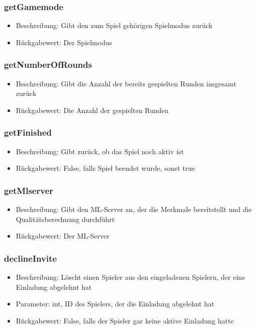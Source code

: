 \documentclass[a4paper]{scrreprt}
\begin{document}
   \subsubsection{getGamemode}
      \begin{itemize}
              \item Beschreibung: Gibt den zum Spiel gehörigen Spielmodus zurück
              \item Rückgabewert: Der Spielmodus
      \end{itemize}
   \subsubsection{getNumberOfRounds}
      \begin{itemize}
              \item Beschreibung: Gibt die Anzahl der bereits gespielten Runden insgesamt zurück
              \item Rückgabewert: Die Anzahl der gespielten Runden
      \end{itemize}     
   \subsubsection{getFinished}
      \begin{itemize}
              \item Beschreibung: Gibt zurück, ob das Spiel noch aktiv ist
              \item Rückgabewert: False, falls Spiel beendet wurde, sonst true
      \end{itemize}
   \subsubsection{getMlserver}
      \begin{itemize}
              \item Beschreibung: Gibt den ML-Server an, der die Merkmale bereitstellt und die Qualitätsberechnung durchführt
              \item Rückgabewert: Der ML-Server
      \end{itemize}
   \subsubsection{declineInvite}
      \begin{itemize}
      \item Beschreibung: Löscht einen Spieler aus den eingeladenen Spielern, der eine Einladung abgelehnt hat
      \item Parameter: int, ID des Spielers, der die Einladung abgelehnt hat
      \item Rückgabewert: False, falls der Spieler gar keine aktive Einladung hatte
      \end{itemize}
\end{document}
